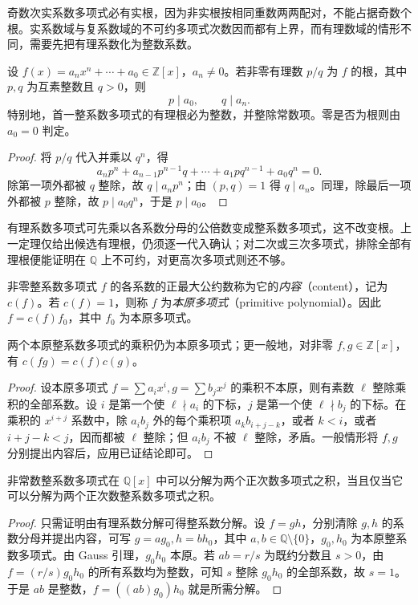 奇数次实系数多项式必有实根，因为非实根按相同重数两两配对，不能占据奇数个根。实系数域与复系数域的不可约多项式次数因而都有上界，而有理数域的情形不同，需要先把有理系数化为整数系数。

\begin{theorem}[有理根的必要条件]
\label{thm:rational-root}
设 $f(x)=a_nx^n+\cdots+a_0\in\mathbb Z[x]$，$a_n\ne0$。若非零有理数 $p/q$ 为 $f$ 的根，其中 $p,q$ 为互素整数且 $q>0$，则
\[
    p\mid a_0,\qquad q\mid a_n.
\]
特别地，首一整系数多项式的有理根必为整数，并整除常数项。零是否为根则由 $a_0=0$ 判定。
\end{theorem}
\begin{proof}
将 $p/q$ 代入并乘以 $q^n$，得
\[
    a_np^n+a_{n-1}p^{n-1}q+\cdots+a_1pq^{n-1}+a_0q^n=0.
\]
除第一项外都被 $q$ 整除，故 $q\mid a_np^n$；由 $(p,q)=1$ 得 $q\mid a_n$。同理，除最后一项外都被 $p$ 整除，故 $p\mid a_0q^n$，于是 $p\mid a_0$。
\end{proof}

有理系数多项式可先乘以各系数分母的公倍数变成整系数多项式，这不改变根。上一定理仅给出候选有理根，仍须逐一代入确认；对二次或三次多项式，排除全部有理根便能证明在 $\mathbb Q$ 上不可约，对更高次多项式则还不够。

\begin{definition}
非零整系数多项式 $f$ 的各系数的正最大公约数称为它的\emph{内容}（content），记为 $c(f)$。若 $c(f)=1$，则称 $f$ 为\emph{本原多项式}（primitive polynomial）。因此 $f=c(f)f_0$，其中 $f_0$ 为本原多项式。
\end{definition}

\begin{lemma}[Gauss 引理]
\label{lem:gauss-primitive}
两个本原整系数多项式的乘积仍为本原多项式；更一般地，对非零 $f,g\in\mathbb Z[x]$，有 $c(fg)=c(f)c(g)$。
\end{lemma}
\begin{proof}
设本原多项式 $f=\sum a_ix^i,g=\sum b_jx^j$ 的乘积不本原，则有素数 $\ell$ 整除乘积的全部系数。设 $i$ 是第一个使 $\ell\nmid a_i$ 的下标，$j$ 是第一个使 $\ell\nmid b_j$ 的下标。在乘积的 $x^{i+j}$ 系数中，除 $a_ib_j$ 外的每个乘积项 $a_kb_{i+j-k}$，或者 $k<i$，或者 $i+j-k<j$，因而都被 $\ell$ 整除；但 $a_ib_j$ 不被 $\ell$ 整除，矛盾。一般情形将 $f,g$ 分别提出内容后，应用已证结论即可。
\end{proof}

\begin{theorem}
\label{thm:gauss-rational-factorization}
非常数整系数多项式在 $\mathbb Q[x]$ 中可以分解为两个正次数多项式之积，当且仅当它可以分解为两个正次数整系数多项式之积。
\end{theorem}
\begin{proof}
只需证明由有理系数分解可得整系数分解。设 $f=gh$，分别清除 $g,h$ 的系数分母并提出内容，可写 $g=ag_0,h=bh_0$，其中 $a,b\in\mathbb Q\setminus\{0\}$，$g_0,h_0$ 为本原整系数多项式。由 Gauss 引理，$g_0h_0$ 本原。若 $ab=r/s$ 为既约分数且 $s>0$，由 $f=(r/s)g_0h_0$ 的所有系数均为整数，可知 $s$ 整除 $g_0h_0$ 的全部系数，故 $s=1$。于是 $ab$ 是整数，$f=((ab)g_0)h_0$ 就是所需分解。
\end{proof}

